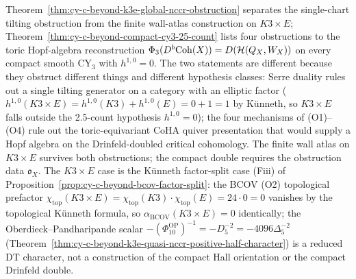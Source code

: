 \begin{remark}
\label{rem:cy-c-beyond-25-count-vs-5fold}
Theorem~\ref{thm:cy-c-beyond-k3e-global-nccr-obstruction} separates
the single-chart tilting obstruction from the finite wall-atlas
construction on $K3 \times E$; Theorem~\ref{thm:cy-c-beyond-compact-cy3-25-count}
lists four obstructions to the toric Hopf-algebra reconstruction
$\Phi_3(D^b\mathrm{Coh}(X)) = D(\mathcal H(Q_X, W_X))$ on every compact
smooth CY$_3$ with $h^{1,0} = 0$. The two statements are different because
they obstruct different things and different hypothesis classes:
Serre duality rules out a single tilting generator on a category with
an elliptic factor ($h^{1,0}(K3 \times E)
= h^{1,0}(K3) + h^{1,0}(E) = 0 + 1 = 1$ by K\"unneth, so
$K3 \times E$ falls outside the 2.5-count hypothesis $h^{1,0} = 0$);
the four mechanisms of (O1)--(O4) rule out the toric-equivariant
CoHA quiver presentation that would supply a Hopf algebra on the
Drinfeld-doubled critical cohomology. The finite wall atlas on
$K3\times E$ survives both obstructions; the compact double requires
the obstruction data $\mathfrak o_X$. The $K3 \times E$ case is the
K\"unneth factor-split case (Fiii) of
Proposition~\ref{prop:cy-c-beyond-bcov-factor-split}: the BCOV
(O2) topological prefactor $\chi_{\mathrm{top}}(K3 \times E) =
\chi_{\mathrm{top}}(K3) \cdot \chi_{\mathrm{top}}(E) = 24 \cdot 0 = 0$
vanishes by the topological K\"unneth formula, so $\alpha_{\mathrm{BCOV}}
(K3 \times E) = 0$ identically; the Oberdieck--Pandharipande scalar
$-(\Phi_{10}^{\mathrm{OP}})^{-1}=-D_5^{-2}
=-4096\Delta_5^{-2}$
(Theorem~\ref{thm:cy-c-beyond-k3e-quasi-nccr-positive-half-character})
is a reduced DT character, not a construction of the compact Hall
orientation or the compact Drinfeld double.
\end{remark}

